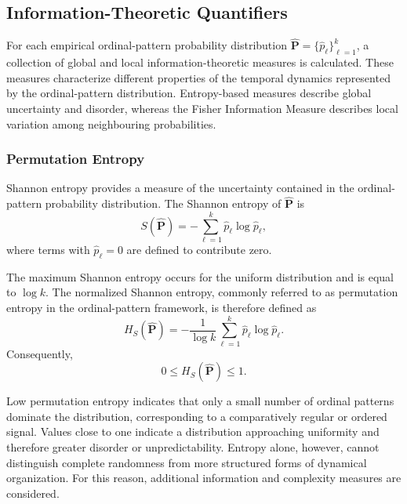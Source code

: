 \documentclass[11pt,a4paper]{article}
\begin{document}
\subsection{Information-Theoretic Quantifiers}

For each empirical ordinal-pattern probability distribution
$\widehat{\mathbf{P}}=\{\widehat{p}_\ell\}_{\ell=1}^{k}$,
a collection of global and local information-theoretic measures is calculated. These measures characterize different properties of the temporal dynamics represented by the ordinal-pattern distribution. Entropy-based measures describe global uncertainty and disorder, whereas the Fisher Information Measure describes local variation among neighbouring probabilities.

\subsubsection{Permutation Entropy}

Shannon entropy provides a measure of the uncertainty contained in the ordinal-pattern probability distribution. The Shannon entropy of
$\widehat{\mathbf{P}}$ is
\begin{equation}
	S(\widehat{\mathbf{P}})
	=
	-\sum_{\ell=1}^{k}
	\widehat{p}_\ell\log \widehat{p}_\ell,
\end{equation}
where terms with $\widehat{p}_\ell=0$ are defined to contribute zero.

The maximum Shannon entropy occurs for the uniform distribution and is equal to $\log k$. The normalized Shannon entropy, commonly referred to as permutation entropy in the ordinal-pattern framework, is therefore defined as
\begin{equation}
	H_{S}(\widehat{\mathbf{P}})
	=
	-\frac{1}{\log k}
	\sum_{\ell=1}^{k}
	\widehat{p}_\ell\log \widehat{p}_\ell.
\end{equation}
Consequently,
\begin{equation}
	0\leq H_{S}(\widehat{\mathbf{P}})\leq1.
\end{equation}

Low permutation entropy indicates that only a small number of ordinal patterns dominate the distribution, corresponding to a comparatively regular or ordered signal. Values close to one indicate a distribution approaching uniformity and therefore greater disorder or unpredictability. Entropy alone, however, cannot distinguish complete randomness from more structured forms of dynamical organization. For this reason, additional information and complexity measures are considered.
\end{document}
